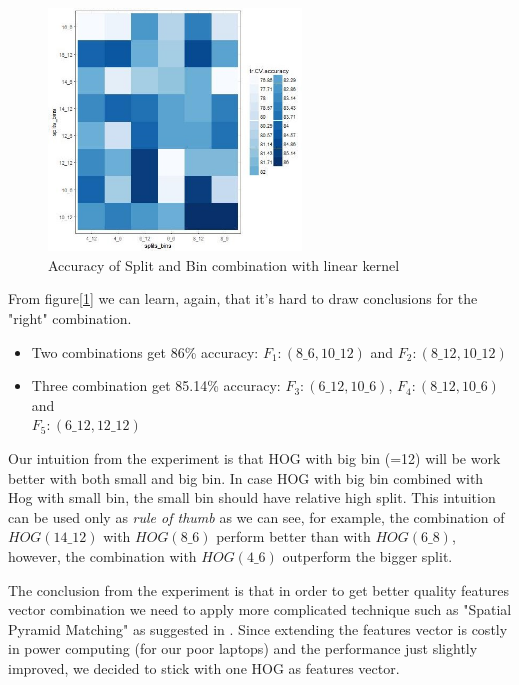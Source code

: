 \begin{figure}[!h]
    \centering
    \includegraphics[width=0.6\textwidth]{Images/Accuracy_for_categories_1a.jpeg}
    \caption{Accuracy of Split and Bin combination with linear kernel}
    \label{fig:exp1a}
\end{figure}

From figure[\ref{fig:exp1a}] we can learn, again, that it's hard to draw conclusions for the "right" combination.
\begin{itemize}
    \item Two combinations get 86\% accuracy: $F_1: (8\_6, 10\_12)$ and $F_2: (8\_12,10\_12)$
    \item Three combination get 85.14\% accuracy: $F_3:(6\_12, 10\_6)$, $F_4:(8\_12, 10\_6)$ and \\ $F_5:(6\_12, 12\_12)$
\end{itemize}

Our intuition from the experiment is that HOG with big bin (=12) will be work better with both small and big bin. In case HOG with big bin combined with Hog with small bin, the small bin should have relative high split. This intuition can be used only as \textit{rule of thumb} as we can see, for example, the combination of $HOG(14\_12)$ with $HOG(8\_6)$ perform better than with $HOG(6\_8)$, however, the combination with $HOG(4\_6)$ outperform the bigger split.

The conclusion from the experiment is that in order to get better quality features vector combination we need to apply more complicated technique such as "Spatial Pyramid Matching" as suggested in \cite{Spatial_Pyramid}. Since extending the features vector is costly in power computing (for our poor laptops) and the performance just slightly improved, we decided to stick with one HOG as features vector.

